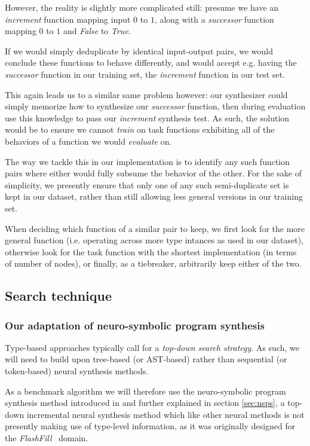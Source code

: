 \documentclass{article}
\begin{document}
However, the reality is slightly more complicated still:
presume we have an \emph{increment} function mapping input $0$ to $1$,
along with a \emph{successor} function mapping $0$ to $1$ and \emph{False} to \emph{True}.

If we would simply deduplicate by identical input-output pairs,
we would conclude these functions to behave differently,
and would accept e.g. having the \emph{successor} function in our training set,
the \emph{increment} function in our test set.

This again leads us to a similar same problem however:
our synthesizer could simply memorize how to synthesize our \emph{successor} function,
then during evaluation use this knowledge to pass our \emph{increment} synthesis test.
As such, the solution would be to ensure we cannot \emph{train} on task functions exhibiting all of the behaviors of a function we would \emph{evaluate} on.

The way we tackle this in our implementation is to identify any such function pairs where either would fully subsume the behavior of the other.
For the sake of simplicity, we presently ensure that only one of any such semi-duplicate set is kept in our dataset,
rather than still allowing less general versions in our training set.

When deciding which function of a similar pair to keep,
we first look for the more general function (i.e. operating across more type intances as used in our dataset),
otherwise look for the task function with the shortest implementation (in terms of number of nodes),
or finally, as a tiebreaker, arbitrarily keep either of the two.

\subsection{Search technique}

\subsubsection{Our adaptation of neuro-symbolic program synthesis} \label{sec:ournsps}

Type-based approaches typically call for a \emph{top-down search strategy}.
As such, we will need to build upon tree-based (or AST-based) rather than sequential (or token-based) neural synthesis methods.

As a benchmark algorithm we will therefore use the neuro-symbolic program synthesis method introduced in \citet{nsps} and further explained in section \ref{sec:nsps},
a top-down incremental neural synthesis method which like other neural methods is not presently making use of type-level information,
as it was originally designed for the \emph{FlashFill}~\citep{prose} domain.
\end{document}
